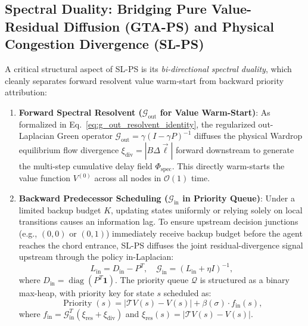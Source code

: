 \documentclass[11pt,a4paper]{article}
\begin{document}
\subsection{Spectral Duality: Bridging Pure Value-Residual Diffusion (GTA-PS) and Physical Congestion Divergence (SL-PS)}
\label{sec:priority_scheduling}

A critical structural aspect of SL-PS is its \textit{bi-directional spectral duality}, which cleanly separates forward resolvent value warm-start from backward priority attribution:
\begin{enumerate}
    \item \textbf{Forward Spectral Resolvent ($\mathcal{G}_{\text{out}}$ for Value Warm-Start)}: As formalized in Eq.~\eqref{eq:g_out_resolvent_identity}, the regularized out-Laplacian Green operator $\mathcal{G}_{\text{out}} = \gamma (I - \gamma P)^{-1}$ diffuses the physical Wardrop equilibrium flow divergence $\xi_{\text{div}} = |B \Delta \vec{\ell}|$ forward downstream to generate the multi-step cumulative delay field $\Phi_{\text{spec}}$. This directly warm-starts the value function $V^{(0)}$ across all nodes in $\mathcal{O}(1)$ time.
    \item \textbf{Backward Predecessor Scheduling ($\mathcal{G}_{\text{in}}$ in Priority Queue)}: Under a limited backup budget $K$, updating states uniformly or relying solely on local transitions causes an information lag. To ensure upstream decision junctions (e.g., $(0, 0)$ or $(0, 1)$) immediately receive backup budget before the agent reaches the chord entrance, SL-PS diffuses the joint residual-divergence signal upstream through the policy in-Laplacian:
    \begin{equation}
    L_{\text{in}} = D_{\text{in}} - P^T, \quad \mathcal{G}_{\text{in}} = (L_{\text{in}} + \eta I)^{-1},
    \end{equation}
    where $D_{\text{in}} = \operatorname{diag}(P^T \mathbf{1})$. The priority queue $\mathcal{Q}$ is structured as a binary max-heap, with priority key for state $s$ scheduled as:
    \begin{equation}
    \operatorname{Priority}(s) = |\mathcal{T} V(s) - V(s)| + \beta(\sigma) \cdot f_{\text{in}}(s),
    \end{equation}
    where $f_{\text{in}} = \mathcal{G}_{\text{in}}^T (\xi_{\text{res}} + \xi_{\text{div}})$ and $\xi_{\text{res}}(s) = |\mathcal{T} V(s) - V(s)|$.
\end{enumerate}
\end{document}
